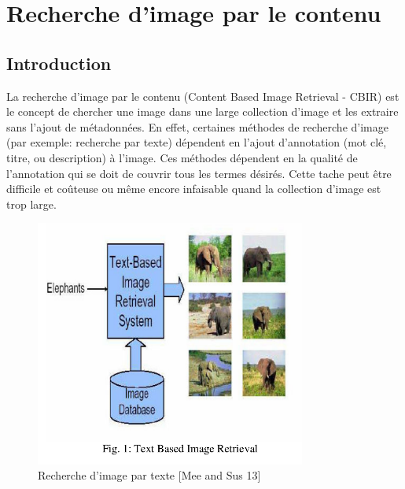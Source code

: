 
\chapter{Recherche d'image par le contenu} %




\section{Introduction}

	La recherche d'image par le contenu (Content Based Image Retrieval - CBIR) est le concept de chercher une image dans une large collection d'image et les extraire sans l'ajout de métadonnées. En effet, certaines méthodes de recherche d'image (par exemple: recherche par texte) dépendent en l'ajout d'annotation (mot clé, titre, ou description) à l'image. Ces méthodes dépendent en la qualité de l'annotation qui se doit  de couvrir tous les termes désirés. Cette tache peut être difficile et coûteuse ou même encore infaisable quand la collection d'image est trop large.

\begin{figure}[htbp]
	\centering
		\includegraphics[width=3.5in]{Figures/textBasedIR.png}
	\caption[An Electron]{Recherche d'image par texte [Mee and Sus 13]}
	\label{fig:Electron}
\end{figure}

